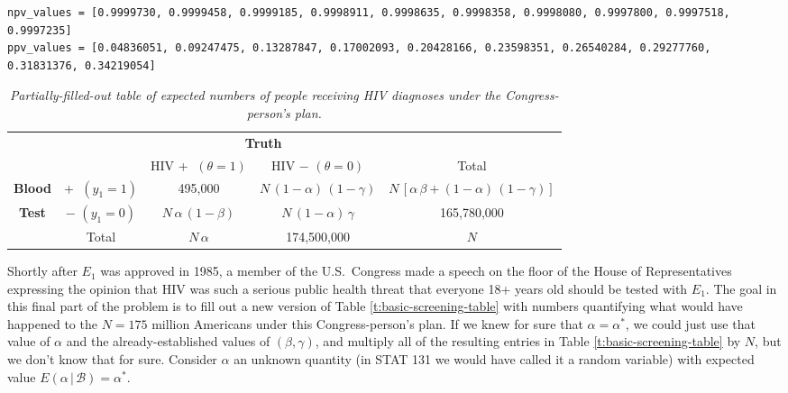 \documentclass[12pt]{article}
\newcommand{\given}{\, | \,}
\begin{document}
\begin{itemize}
\begin{itemize}
\begin{itemize}
\begin{verbatim}
npv_values = [0.9999730, 0.9999458, 0.9999185, 0.9998911, 0.9998635, 0.9998358, 0.9998080, 0.9997800, 0.9997518, 0.9997235]
ppv_values = [0.04836051, 0.09247475, 0.13287847, 0.17002093, 0.20428166, 0.23598351, 0.26540284, 0.29277760, 0.31831376, 0.34219054]
\end{verbatim}
\end{itemize}

\end{itemize}

\begin{table}[t!]

\centering

\caption{\textit{Partially-filled-out table of expected numbers of people receiving HIV diagnoses under the Congress-person's plan.}}

\label{t:congressperson-table}

\bigskip

\begin{tabular}{cc|c|c|c}

& \multicolumn{1}{c}{} & \multicolumn{2}{c}{\textbf{Truth}} \\

& \multicolumn{1}{c}{} & \multicolumn{1}{c}{HIV \textcircled{+} $( \theta = 1 )$} & \multicolumn{1}{c}{HIV \textcircled{$-$} $( \theta = 0 )$}  & Total \\ \cline{3-4}

\textbf{Blood} & \textcircled{+} $( y_1 = 1 )$ & 495,000 & $N \, ( 1 - \alpha ) \, ( 1 - \gamma )$ & $N \, [ \alpha \, \beta + ( 1 - \alpha ) \, ( 1 - \gamma ) ]$ \\ \cline{3-4}

\textbf{Test} & \textcircled{$-$} $( y_1 = 0 )$ & $N \, \alpha \, ( 1 - \beta )$ & $N \, ( 1 - \alpha ) \, \gamma$ & 165,780,000 \\ \cline{3-4}

& \multicolumn{1}{c}{Total} & \multicolumn{1}{c}{$N \, \alpha$} & \multicolumn{1}{c}{174,500,000} & $N$

\end{tabular}

\end{table}




Shortly after $E_1$ was approved in 1985, a member of the U.S.~Congress made a speech on the floor of the House of Representatives expressing the opinion that HIV was such a serious public health threat that everyone 18+ years old should be tested with $E_1$. The goal in this final part of the problem is to fill out a new version of Table \ref{t:basic-screening-table} with numbers quantifying what would have happened to the $N = 175$ million Americans under this Congress-person's plan. If we knew for sure that $\alpha = \alpha^*$, we could just use that value of $\alpha$ and the already-established values of $( \beta, \gamma )$, and multiply all of the resulting entries in Table \ref{t:basic-screening-table} by $N$, but we don't know that for sure. Consider $\alpha$ an unknown quantity (in STAT 131 we would have called it a random variable) with expected value $E ( \alpha \given \mathcal{ B } ) = \alpha^*$. 


\end{itemize}
\end{document}
